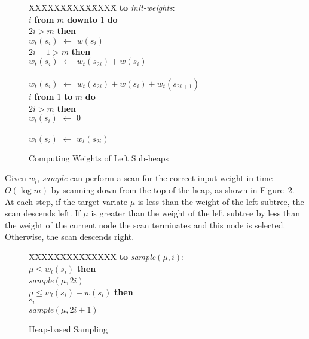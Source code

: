 \documentclass[12pt]{article}
\newcommand{\asgn}{\,\,\leftarrow\,\,}
\begin{document}
  \begin{figure}
    \centering
    \begin{minipage}{0.6\textwidth}
      \begin{tabbing}
      XX\=XXXX\=XXXX\=XXXX\=\kill
      {\bf to} {\it init-weights}: \\
       $i$ {\bf from} $m$ {\bf downto} $1$ {\bf do} \\
      \> $2i > m$ {\bf then} \\
      \>\>\>$w_t(s_i) \asgn w(s_i)$ \\
      \> $2i + 1 > m$ {\bf then} \\
      \>\>\>$w_t(s_i) \asgn w_t(s_{2i}) + w(s_i)$ \\
      \>\\
      \>\>\>$w_t(s_i) \asgn w_t(s_{2i}) + w(s_i) + w_t(s_{2i+1})$ \\
       $i$ {\bf from} $1$ {\bf to} $m$ {\bf do} \\
      \> $2i > m$ {\bf then} \\
      \>\>\>$w_l(s_i) \asgn 0$ \\
      \> \\
      \>\>\>$w_l(s_i) \asgn w_t(s_{2i})$
    \end{tabbing}
    \end{minipage}
    \caption{Computing Weights of Left Sub-heaps}\label{fig-heap}
  \end{figure}

  Given $w_l$, {\em sample} can perform a scan for the
  correct input weight in time $O(\log m)$ by scanning down
  from the top of the heap, as shown in
  Figure~\ref{fig-onlm}.  At each step, if the target
  variate $\mu$ is less than the weight of the left subtree,
  the scan descends left.  If $\mu$ is greater than the
  weight of the left subtree by less than the weight of the
  current node the scan terminates and this node is
  selected.  Otherwise, the scan descends right.

  \begin{figure}
    \centering
    \begin{minipage}{0.6\textwidth}
      \begin{tabbing}
      XX\=XXXX\=XXXX\=XXXX\=\kill
      {\bf to} {\it sample}$(\mu,i)$: \\
       $\mu \le w_l(s_i)$ {\bf then} \\
      \> {\it sample}$(\mu,2i)$ \\
       $\mu \le w_l(s_i) + w(s_i)$ {\bf then} \\
      \> $s_i$ \\
       {\it sample}$(\mu,2i + 1)$
    \end{tabbing}
    \end{minipage}
    \caption{Heap-based Sampling}\label{fig-onlm}
  \end{figure}
\end{document}

